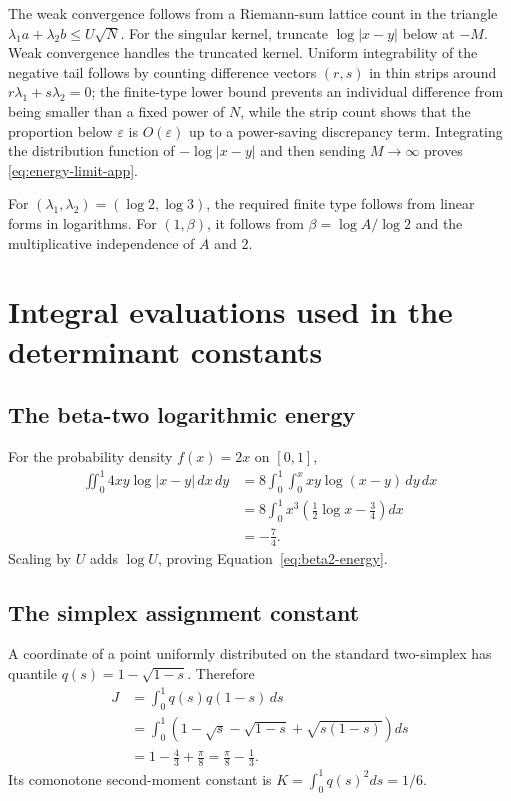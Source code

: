\documentclass[11pt]{article}
\theoremstyle{definition}
\begin{document}
The weak convergence follows from a Riemann-sum lattice count in the triangle
$\lambda_1a+\lambda_2b\le U\sqrt N$.  For the singular kernel, truncate
$\log|x-y|$ below at $-M$.  Weak convergence handles the truncated kernel.
Uniform integrability of the negative tail follows by counting difference
vectors $(r,s)$ in thin strips around
$r\lambda_1+s\lambda_2=0$; the finite-type lower bound prevents an individual
difference from being smaller than a fixed power of $N$, while the strip count
shows that the proportion below $\varepsilon$ is $O(\varepsilon)$ up to a
power-saving discrepancy term.  Integrating the distribution function of
$-\log|x-y|$ and then sending $M\to\infty$ proves
\eqref{eq:energy-limit-app}.

For $(\lambda_1,\lambda_2)=(\log2,\log3)$, the required finite type follows from
linear forms in logarithms.  For $(1,\beta)$, it follows from
$\beta=\log A/\log2$ and the multiplicative independence of $A$ and $2$.

\section{Integral evaluations used in the determinant constants}

\subsection{The beta-two logarithmic energy}

For the probability density $f(x)=2x$ on $[0,1]$,
\begin{align*}
 \iint_0^1 4xy\log|x-y|\,dx\,dy
 &=8\int_0^1\int_0^xxy\log(x-y)\,dy\,dx\\
 &=8\int_0^1x^3\left(\frac12\log x-\frac34\right)dx\\
 &=-\frac74.
\end{align*}
Scaling by $U$ adds $\log U$, proving
Equation~\eqref{eq:beta2-energy}.

\subsection{The simplex assignment constant}

A coordinate of a point uniformly distributed on the standard two-simplex has
quantile $q(s)=1-\sqrt{1-s}$.  Therefore
\begin{align*}
 J&=\int_0^1q(s)q(1-s)\,ds\\
 &=\int_0^1\left(1-\sqrt s-\sqrt{1-s}+\sqrt{s(1-s)}\right)ds\\
 &=1-\frac43+\frac\pi8
 =\frac\pi8-\frac13.
\end{align*}
Its comonotone second-moment constant is
$K=\int_0^1q(s)^2ds=1/6$.
\end{document}
